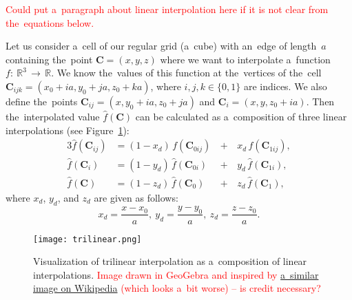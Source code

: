 				\textcolor{red}{Could put a~paragraph about linear interpolation here if it is not clear from the~equations below.}
				
				Let us consider a~cell of our regular grid (a~cube) with an~edge of length~$a$ containing the~point $\mathbf{C} = (x,y,z)$ where we want to interpolate a~function $f\!\!:~\!\!\mathbb{R}^3\,\to\,\mathbb{R}$. We know the~values of this function at the~vertices of the~cell $\mathbf{C}_{ijk} = (x_0+ia,y_0+ja,z_0+ka)$, where $i,j,k \in \{0,1\}$ are indices. We also define the~points $\mathbf{C}_{ij} = (x,y_0+ia,z_0+ja)$ and $\mathbf{C}_i=(x,y,z_0+ia)$. Then the~interpolated value $\widehat{f}(\mathbf{C})$ can be calculated as a~composition of three linear interpolations (see Figure~\ref{fig:trilin}):
					\begin{alignat}{3}
						\widehat{f}(\mathbf{C}_{ij}) &= (1-x_d)\,f(\mathbf{C}_{0ij}) \,&+&\,x_d\, f(\mathbf{C}_{1ij}),\\
						\widehat{f}(\mathbf{C}_{i}) &= (1-y_d)\,\widehat{f}(\mathbf{C}_{0i}) &+&\,y_d\, \widehat{f}(\mathbf{C}_{1i}),\\
						\widehat{f}(\mathbf{C}) &= (1-z_d)\,\widehat{f}(\mathbf{C}_0) &+&\,z_d\, \widehat{f}(\mathbf{C}_1),
					\end{alignat}
				where $x_d$, $y_d$, and $z_d$ are given as follows:
					\begin{equation}
						x_d = \frac{x-x_0}{a},~y_d = \frac{y-y_0}{a},~z_d = \frac{z-z_0}{a}.
					\end{equation}
					
				\begin{figure}
					\centering
					\texttt{[image: trilinear.png]}
					\caption{Visualization of trilinear interpolation as a~composition of linear interpolations. \textcolor{red}{Image drawn in GeoGebra and inspired by \href{https://commons.wikimedia.org/wiki/File:3D_interpolation2.svg}{a~similar image on Wikipedia} (which looks a~bit worse) -- is credit necessary?}}
					\label{fig:trilin}
				\end{figure}
					
